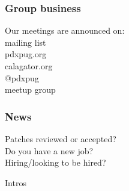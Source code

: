 \documentclass{beamer}
\begin{document}
\frame
{
  \frametitle{Group business}
  \begin{center}
{\large Our meetings are announced on:\\}
mailing list\\
pdxpug.org\\
calagator.org\\
@pdxpug\\
meetup group\\
\vspace{5mm}
  \end{center}
}

\frame
{
  \frametitle{News}
  \begin{center}
Patches reviewed or accepted?\\
Do you have a new job?\\
Hiring/looking to be hired?\\
  \end{center}
}

\frame
{
  \begin{center}
{\huge Intros\\}
  \end{center}
}
\end{document}

